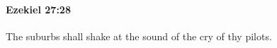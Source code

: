 
		\paragraph{Ezekiel 27:28} %
			\label{EZEKIEL-27-28}

			The suburbs shall shake at the sound of the cry of thy pilots.


